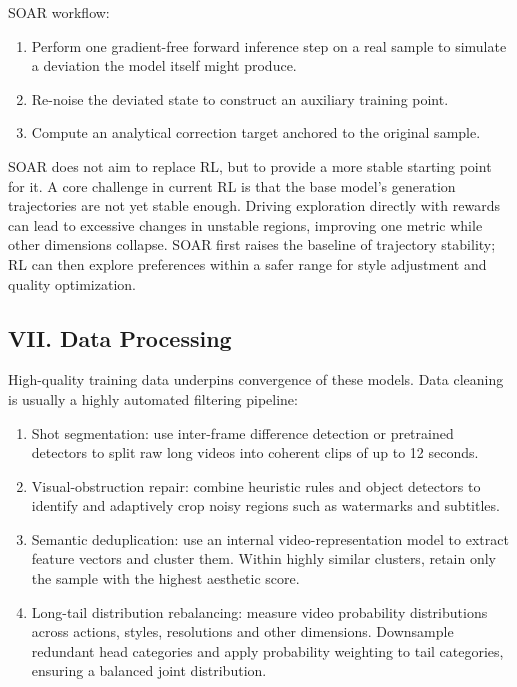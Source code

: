 SOAR workflow:

\begin{enumerate}
\def\labelenumi{\arabic{enumi}.}
\item
  Perform one gradient-free forward inference step on a real sample to simulate a deviation the model itself might produce.
\item
  Re-noise the deviated state to construct an auxiliary training point.
\item
  Compute an analytical correction target anchored to the original sample.
\end{enumerate}

SOAR does not aim to replace RL, but to provide a more stable starting point for it. A core challenge in current RL is that the base model's generation trajectories are not yet stable enough. Driving exploration directly with rewards can lead to excessive changes in unstable regions, improving one metric while other dimensions collapse. SOAR first raises the baseline of trajectory stability; RL can then explore preferences within a safer range for style adjustment and quality optimization.

\hypertarget{vii.-data-processing}{%
\subsection{VII. Data Processing}\label{vii.-data-processing}}

High-quality training data underpins convergence of these models. Data cleaning is usually a highly automated filtering pipeline:

\begin{enumerate}
\def\labelenumi{\arabic{enumi}.}
\item
  Shot segmentation: use inter-frame difference detection or pretrained detectors to split raw long videos into coherent clips of up to 12 seconds.
\item
  Visual-obstruction repair: combine heuristic rules and object detectors to identify and adaptively crop noisy regions such as watermarks and subtitles.
\item
  Semantic deduplication: use an internal video-representation model to extract feature vectors and cluster them. Within highly similar clusters, retain only the sample with the highest aesthetic score.
\item
  Long-tail distribution rebalancing: measure video probability distributions across actions, styles, resolutions and other dimensions. Downsample redundant head categories and apply probability weighting to tail categories, ensuring a balanced joint distribution.
\end{enumerate}

